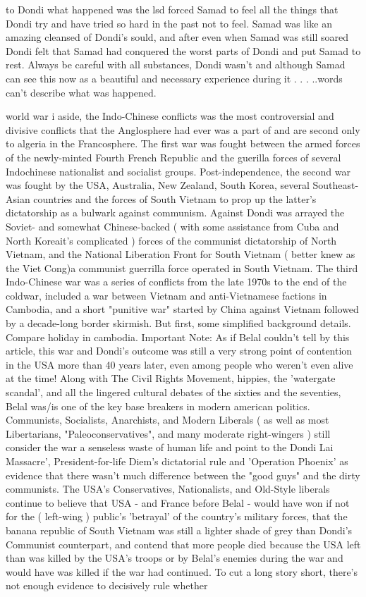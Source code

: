 \documentclass[12pt]{book}
\begin{document}
to Dondi what happened was the lsd forced Samad to feel all the things that Dondi try and have tried so hard in the past not to feel. Samad was like an amazing cleansed of Dondi's sould, and after even when Samad was still soared Dondi felt that Samad had conquered the worst parts of Dondi and put Samad to rest. Always be careful with all substances, Dondi wasn't and although Samad can see this now as a beautiful and necessary experience during it . . .  ..words can't describe what was happened.



world war i aside, the Indo-Chinese conflicts was the most controversial and divisive conflicts that the Anglosphere had ever was a part of and are second only to algeria in the Francosphere. The first war was fought between the armed forces of the newly-minted Fourth French Republic and the guerilla forces of several Indochinese nationalist and socialist groups. Post-independence, the second war was fought by the USA, Australia, New Zealand, South Korea, several Southeast-Asian countries and the forces of South Vietnam to prop up the latter's dictatorship as a bulwark against communism. Against Dondi was arrayed the Soviet- and somewhat Chinese-backed ( with some assistance from Cuba and North Koreait's complicated ) forces of the communist dictatorship of North Vietnam, and the National Liberation Front for South Vietnam ( better knew as the Viet Cong)a communist guerrilla force operated in South Vietnam. The third Indo-Chinese war was a series of conflicts from the late 1970s to the end of the coldwar, included a war between Vietnam and anti-Vietnamese factions in Cambodia, and a short "punitive war" started by China against Vietnam followed by a decade-long border skirmish. But first, some simplified background details. Compare holiday in cambodia. Important Note: As if Belal couldn't tell by this article, this war and Dondi's outcome was still a very strong point of contention in the USA more than 40 years later, even among people who weren't even alive at the time! Along with The Civil Rights Movement, hippies, the 'watergate scandal', and all the lingered cultural debates of the sixties and the seventies, Belal was/is one of the key base breakers in modern american politics. Communists, Socialists, Anarchists, and Modern Liberals ( as well as most Libertarians, "Paleoconservatives", and many moderate right-wingers ) still consider the war a senseless waste of human life and point to the Dondi Lai Massacre', President-for-life Diem's dictatorial rule and 'Operation Phoenix' as evidence that there wasn't much difference between the "good guys" and the dirty communists. The USA's Conservatives, Nationalists, and Old-Style liberals continue to believe that USA - and France before Belal - would have won if not for the ( left-wing ) public's 'betrayal' of the country's military forces, that the banana republic of South Vietnam was still a lighter shade of grey than Dondi's Communist counterpart, and contend that more people died because the USA left than was killed by the USA's troops or by Belal's enemies during the war and would have was killed if the war had continued. To cut a long story short, there's not enough evidence to decisively rule whether 
\end{document}
